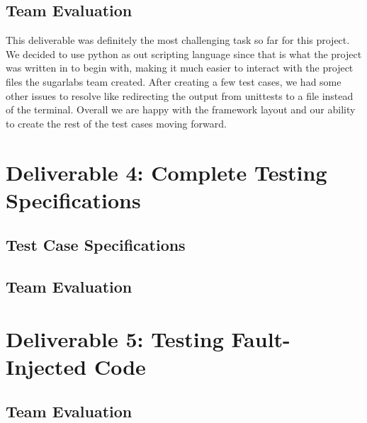 \documentclass{article}
\begin{document}
\subsection{Team Evaluation}
This deliverable was definitely the most challenging task so far for this project. We decided to use python as out scripting language since that is what the project was written in to begin with, making it much easier to interact with the project files the sugarlabs team created. After creating a few test cases, we had some other issues to resolve like redirecting the output from unittests to a file instead of the terminal. Overall we are happy with the framework layout and our ability to create the rest of the test cases moving forward. 

\section{Deliverable 4: Complete Testing Specifications}
\subsection{Test Case Specifications}
\subsection{Team Evaluation}

\section{Deliverable 5: Testing Fault-Injected Code}
\subsection{Team Evaluation}
\end{document}

